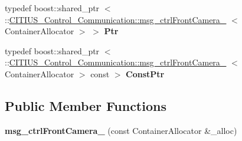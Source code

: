 \begin{DoxyCompactItemize}
\item 
\hypertarget{struct_c_i_t_i_u_s___control___communication_1_1msg__ctrl_front_camera___aedb02590a08d8e2f3dc2c1f40f785d7e}{typedef boost\-::shared\-\_\-ptr\*
$<$ \-::\hyperlink{struct_c_i_t_i_u_s___control___communication_1_1msg__ctrl_front_camera__}{\-C\-I\-T\-I\-U\-S\-\_\-\-Control\-\_\-\-Communication\-::msg\-\_\-ctrl\-Front\-Camera\-\_\-}\*
$<$ \-Container\-Allocator $>$ $>$ {\bfseries \-Ptr}}\label{struct_c_i_t_i_u_s___control___communication_1_1msg__ctrl_front_camera___aedb02590a08d8e2f3dc2c1f40f785d7e}

\item 
\hypertarget{struct_c_i_t_i_u_s___control___communication_1_1msg__ctrl_front_camera___ad0f6d53fc130efe9d824cdb04d254cb7}{typedef boost\-::shared\-\_\-ptr\*
$<$ \-::\hyperlink{struct_c_i_t_i_u_s___control___communication_1_1msg__ctrl_front_camera__}{\-C\-I\-T\-I\-U\-S\-\_\-\-Control\-\_\-\-Communication\-::msg\-\_\-ctrl\-Front\-Camera\-\_\-}\*
$<$ \-Container\-Allocator $>$ const  $>$ {\bfseries \-Const\-Ptr}}\label{struct_c_i_t_i_u_s___control___communication_1_1msg__ctrl_front_camera___ad0f6d53fc130efe9d824cdb04d254cb7}

\end{DoxyCompactItemize}
\subsection*{\-Public \-Member \-Functions}
\begin{DoxyCompactItemize}
\item 
\hypertarget{struct_c_i_t_i_u_s___control___communication_1_1msg__ctrl_front_camera___aed67284f666bc181f2047d236875a18f}{{\bfseries msg\-\_\-ctrl\-Front\-Camera\-\_\-} (const \-Container\-Allocator \&\-\_\-alloc)}\label{struct_c_i_t_i_u_s___control___communication_1_1msg__ctrl_front_camera___aed67284f666bc181f2047d236875a18f}

\end{DoxyCompactItemize}
